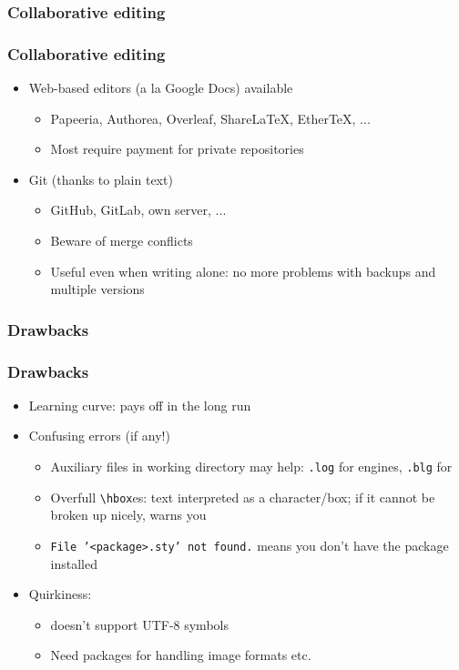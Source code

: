 \documentclass[xetex,colorlinks]{beamer} %
\begin{document}
  \subsubsection{Collaborative editing}
  \begin{frame}
    \frametitle{Collaborative editing}
    \begin{itemize}
     \item Web-based editors (a la Google Docs) available
     \begin{itemize}
      \item Papeeria, Authorea, Overleaf, ShareLaTeX, EtherTeX, ...
      \item Most require payment for private repositories
     \end{itemize}
     \item Git (thanks to plain text)
     \begin{itemize}
      \item GitHub, GitLab, own server, ...
      \item Beware of merge conflicts
      \item Useful even when writing alone: no more problems with backups and multiple versions
     \end{itemize}
    \end{itemize}
  \end{frame}
  
  \subsubsection{Drawbacks}
  \begin{frame}
    \frametitle{Drawbacks}
    \begin{itemize}
     \item Learning curve: pays off in the long run
     \item Confusing errors (if any!)
     \begin{itemize}
      \item Auxiliary files in working directory may help: \texttt{.log} for engines, \texttt{.blg} for 
      \item Overfull \texttt{\textbackslash{}hbox}es: text interpreted as a character/box; if it cannot be broken up nicely, warns you
      \item \texttt{File '<package>.sty' not found.} means you don't have the package installed
     \end{itemize}
     \item Quirkiness:
     \begin{itemize}
      \item {} doesn’t support UTF-8 symbols
      \item Need packages for handling image formats etc.
     \end{itemize}
    \end{itemize}
  \end{frame}
  
\end{document}
